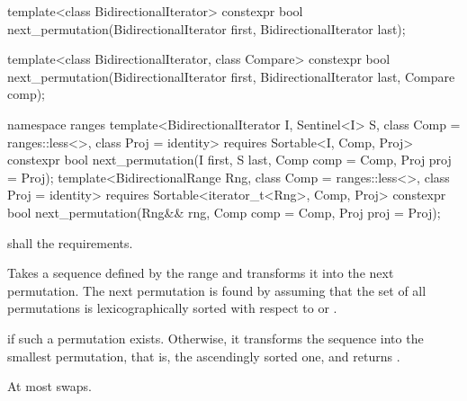 %
\begin{itemdecl}
template<class BidirectionalIterator>
  constexpr bool next_permutation(BidirectionalIterator first,
                                  BidirectionalIterator last);

template<class BidirectionalIterator, class Compare>
  constexpr bool next_permutation(BidirectionalIterator first,
                                  BidirectionalIterator last, Compare comp);
\end{itemdecl}
\begin{addedblock}
\begin{itemdecl}
namespace ranges {
  template<BidirectionalIterator I, Sentinel<I> S, class Comp = ranges::less<>,
      class Proj = identity>
    requires Sortable<I, Comp, Proj>
    constexpr bool
      next_permutation(I first, S last, Comp comp = Comp{}, Proj proj = Proj{});
  template<BidirectionalRange Rng, class Comp = ranges::less<>,
      class Proj = identity>
    requires Sortable<iterator_t<Rng>, Comp, Proj>
    constexpr bool
      next_permutation(Rng&& rng, Comp comp = Comp{}, Proj proj = Proj{});
}
\end{itemdecl}
\end{addedblock}

\begin{itemdescr}
\pnum
\requires
{}
 shall  the
 requirements.

\pnum
\effects
Takes a sequence defined by the range
and transforms it into the next permutation.
The next permutation is found by assuming that the set of all permutations is
lexicographically sorted with respect to
or  .

\pnum
\returns
{}
if such a permutation exists.
Otherwise, it transforms the sequence into the smallest permutation,
that is, the ascendingly sorted one, and returns
.

\pnum
\complexity
At most
swaps.
\end{itemdescr}


